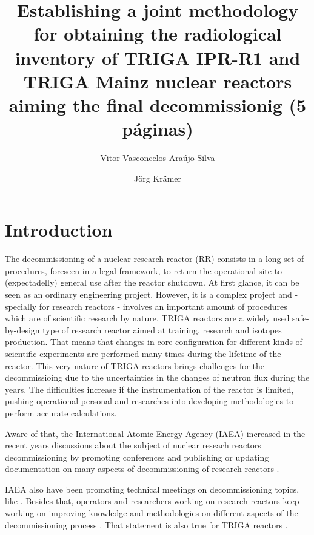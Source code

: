 \documentclass[11pt]{article} %
\title{Establishing a joint methodology for obtaining the radiological inventory of TRIGA IPR-R1 and TRIGA Mainz nuclear reactors aiming the final decommissionig (5 páginas)}
\author[1]{Vitor Vasconcelos Araújo Silva}
\author[2]{Jörg Krämer}
\affil[1]{Centro de Desenvolvimento da Tecnologia Nuclear - CDTN/CNEN}
\affil[2]{Universität Johannes Gutenberg Mainz}
\date{} %
\begin{document}
\maketitle

\section{Introduction}

The decommissioning of a nuclear research reactor (RR) consists in a long set of procedures, foreseen in a legal framework, to return the operational site to (expectadelly) general use after the reactor shutdown. At first glance, it can be seen as an ordinary engineering project. However, it is a complex project and - specially for research reactors - involves an important amount of procedures which are of scientific research by nature. TRIGA reactors \cite{TRIGA} are a widely used safe-by-design type of research reactor aimed at training, research and isotopes production. That means that changes in core configuration for different kinds of scientific experiments are performed many times during the lifetime of the reactor. This very nature of TRIGA reactors brings challenges for the decommissioing due to the uncertainties in the changes of neutron flux during the years. The difficulties increase if the instrumentation of the reactor is limited, pushing operational personal and researches into developing methodologies to perform accurate calculations.

Aware of that, the International Atomic Energy Agency (IAEA) increased in the recent years discussions about the subject of nuclear reseach reactors decommissioning by promoting conferences \cite{IAEA_PS_2025} and publishing or updating documentation on many aspects of decommissioning of research reactors \cite{IAEA_TRS_494_2024}.

IAEA also have been promoting technical meetings on decommissioning topics, like \cite{3TM}. Besides that, operators and researchers working on research reactors keep working on improving knowledge and methodologies on different aspects of the decommissioning process \cite{a}. That statement is also true for TRIGA reactors \cite{b}.


\end{document}
